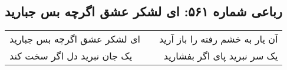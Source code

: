 \begin{center}
\section*{رباعی شماره ۵۶۱: ای لشکر عشق اگرچه بس جبارید}
\label{sec:0561}
\begin{longtable}{l p{0.5cm} r}
ای لشکر عشق اگرچه بس جبارید
&&
آن یار به خشم رفته را باز آرید
\\
یک جان نبرید دل اگر سخت کند
&&
یک سر نبرید پای اگر بفشارید
\\
\end{longtable}
\end{center}
